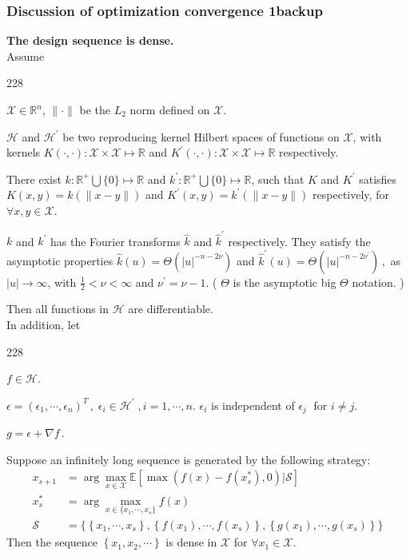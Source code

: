 \documentclass{beamer}
\newcommand{\barrow}{\item[\color{darkred}\ding{228}]}
\begin{document}
\begin{frame}
    \frametitle{Discussion of optimization convergence 1\hfill \scriptsize{backup}}\tiny
    \begin{theorem}
    \textbf{The design sequence is dense.}\\
    Assume
    \begin{dinglist}{228}
        \barrow $\mathcal{X} \in \mathbb{R}^n$, $\|\cdot\|$ be the $L_2$ norm defined on $\mathcal{X}$.
        \barrow $\mathcal{H}$ and $\mathcal{H}^\prime$ be two reproducing kernel Hilbert spaces
              of functions
              on $\mathcal{X}$, with kernels $K(\cdot, \cdot): \mathcal{X}\times \mathcal{X}\mapsto
               \mathbb{R}$ and $K^\prime(\cdot, \cdot): \mathcal{X}\times \mathcal{X}\mapsto
               \mathbb{R}$ respectively.
        \barrow There exist $k: \mathbb{R}^+ \bigcup \{0\}\mapsto \mathbb{R}$ and
              $k^\prime: \mathbb{R}^+ \bigcup\{0\}\mapsto \mathbb{R}$, such that
              $K$ and $K^\prime$ satisfies $K(x,y) = k(\|x-y\|)$ and
              $K^\prime(x,y) = k^\prime(\|x-y\|)$ respectively, for $\forall x, y
               \in \mathcal{X}$.
        \barrow $k$ and $k^\prime$ has the Fourier transforms $\hat{k}$
              and $\hat{k}^\prime$ respectively.
              They satisfy the asymptotic properties
              $\hat{k}(u) = {\Theta}(|u|^{-n-2\nu})$ and
              $\hat{k}^\prime(u) = {\Theta}(|u|^{-n-2\nu^\prime})\,,$
              as $|u|\rightarrow \infty$, with $\frac{1}{2}<\nu<\infty$ and $\nu^\prime = \nu-1$.
              ( $\Theta$ is the asymptotic big $\Theta$ notation. )
    \end{dinglist}
    Then all functions in $\mathcal{H}$ are differentiable.\\

    In addition, let
    \begin{dinglist}{228}
        \barrow $f\in \mathcal{H}$.
        \barrow $\epsilon = \left(\epsilon_1,\cdots,\epsilon_n \right)^T\,, 
               \; \epsilon_i\in\mathcal{H}^\prime\;, i=1,\cdots,n$.
              $\epsilon_i$ is independent of $\epsilon_j\;$ for $i\neq j$.
        \barrow $
                  g = \epsilon + \nabla f\,.
              $
    \end{dinglist}
    Suppose an infinitely long sequence is generated by the following strategy:
    \begin{equation*}\begin{split}
        x_{s+1} &= \arg\max_{x\in\mathcal{X}} \mathbb{E} \left[
        \max\left( f(x) -  f(x_s^*) ,0\right) \Big| \mathcal{S}
        \right]\\
        x_s^* &= \arg\max_{x\in\{x_1,\cdots,x_s\}}f(x)\\
        \mathcal{S} &= \Big\{ \left\{x_1,\cdots, x_s\right\} ,
        \left\{f(x_1),\cdots, f(x_s)\right\},
        \left\{g(x_1),\cdots, g(x_s)\right\}\Big\}
    \end{split}\end{equation*}
    Then the sequence $\left\{ x_1, x_2, \cdots \right\}$
    is dense in $\mathcal{X}$ for $\forall x_1\in \mathcal{X}$.
    \label{theorem: 2}
\end{theorem}
\end{frame}
\end{document}
